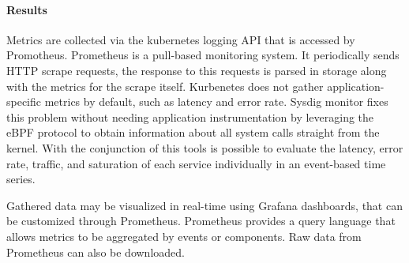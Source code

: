 \paragraph{Results}
Metrics are collected via the kubernetes logging API that is accessed by Promotheus. Prometheus is a pull-based monitoring system. It periodically sends HTTP scrape requests, the response to this requests is parsed in storage along with the metrics for the scrape itself.
Kurbenetes does not gather application-specific metrics by default, such as latency and error rate. Sysdig monitor fixes this problem without needing application instrumentation by leveraging the eBPF protocol to obtain information about all system calls straight from the kernel.
With the conjunction of this tools is possible to evaluate the latency, error rate, traffic, and saturation of each service individually in an event-based time series.

Gathered data may be visualized in real-time using Grafana dashboards, that can be customized through Prometheus.
Prometheus provides a query language that allows metrics to be aggregated by events or components.
Raw data from Prometheus can also be downloaded.